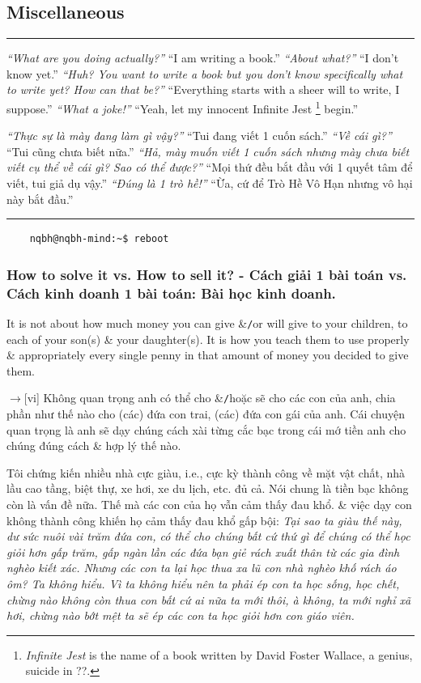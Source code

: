 \documentclass[12pt,oneside]{book}
\begin{document}

\subsection{Miscellaneous}
\hrule
\begin{multicols}{2}\small
	{\it ``What are you doing actually?''} ``I am writing a book.'' {\it ``About what?''} ``I don't know yet.'' {\it ``Huh? You want to write a book but you don't know specifically what to write yet? How can that be?''} ``Everything starts with a sheer will to write, I suppose.'' {\it ``What a joke!''} ``Yeah, let my innocent Infinite Jest \footnote{{\it Infinite Jest} is the name of a book written by {\sc David Foster Wallace}, a genius, suicide in ??.} begin.''
	\columnbreak
	
	{\it ``Thực sự là mày đang làm gì vậy?''} ``Tui đang viết 1 cuốn sách.'' {\it ``Về cái gì?''} ``Tui cũng chưa biết nữa.'' {\it ``Hả, mày muốn viết 1 cuốn sách nhưng mày chưa biết viết cụ thể về cái gì? Sao có thể được?''} ``Mọi thứ đều bắt đầu với 1 quyết tâm để viết, tui giả dụ vậy.'' {\it ``Đúng là 1 trò hề!''} ``Ừa, cứ để Trò Hề Vô Hạn nhưng vô hại này bắt đầu.''	
\end{multicols}
\hrule
\noindent
\begin{verbatim}
	nqbh@nqbh-mind:~$ reboot
\end{verbatim}

\subsubsection{How to solve it vs. How to sell it? - Cách giải 1 bài toán vs. Cách kinh doanh 1 bài toán: Bài học kinh doanh.}
It is not about how much money you can give \&{\tt/}or will give to your children, to each of your son(s) \& your daughter(s). It is how you teach them to use properly \& appropriately every single penny in that amount of money you decided to give them.

{\sf[en]$\to$[vi]} Không quan trọng anh có thể cho \&{\tt/}hoặc sẽ cho các con của anh, chia phần như thế nào cho (các) đứa con trai, (các) đứa con gái của anh. Cái chuyện quan trọng là anh sẽ dạy chúng cách xài từng cắc bạc trong cái mớ tiền anh cho chúng đúng cách \& hợp lý thế nào.

Tôi chứng kiến nhiều nhà cực giàu, i.e., cực kỳ thành công về mặt vật chất, nhà lầu cao tầng, biệt thự, xe hơi, xe du lịch, etc. đủ cả. Nói chung là tiền bạc không còn là vấn đề nữa. Thế mà các con của họ vẫn cảm thấy đau khổ. \& việc dạy con không thành công khiến họ cảm thấy đau khổ gấp bội: {\it Tại sao ta giàu thế này, dư sức nuôi vài trăm đứa con, có thể cho chúng bất cứ thứ gì để chúng có thể học giỏi hơn gấp trăm, gấp ngàn lần các đứa bạn giẻ rách xuất thân từ các gia đình nghèo kiết xác. Nhưng các con ta lại học thua xa lũ con nhà nghèo khố rách áo ôm? Ta không hiểu. Vì ta không hiểu nên ta phải ép con ta học sống, học chết, chừng nào không còn thua con bất cứ ai nữa ta mới thôi, à không, ta mới nghỉ xã hơi, chừng nào bớt mệt ta sẽ ép các con ta học giỏi hơn con giáo viên.}
\end{document}
